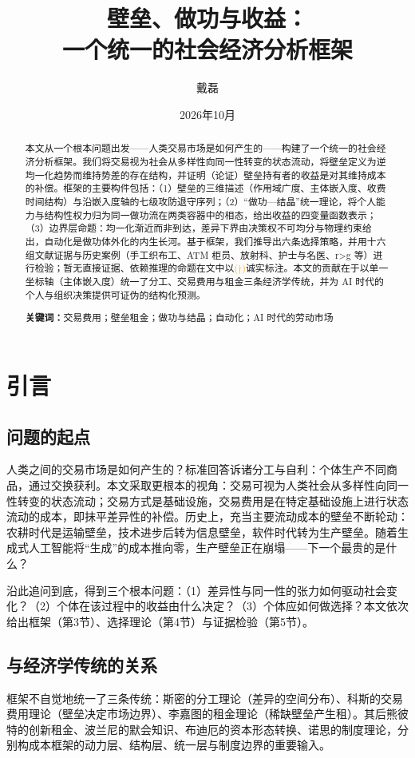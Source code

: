 \documentclass[11pt]{ctexart}
\title{壁垒、做功与收益：\\一个统一的社会经济分析框架}
\author{戴磊}
\date{2026年10月}
\newcommand{\infmark}{\textcolor{orange}{(\(\dagger\))}}
\begin{document}
\maketitle

\begin{abstract}
本文从一个根本问题出发——人类交易市场是如何产生的——构建了一个统一的社会经济分析框架。我们将交易视为社会从多样性向同一性转变的状态流动，将壁垒定义为逆均一化趋势而维持势差的存在结构，并证明（论证）壁垒持有者的收益是对其维持成本的补偿。框架的主要构件包括：（1）壁垒的三维描述（作用域广度、主体嵌入度、收费时间结构）与沿嵌入度轴的七级攻防退守序列；（2）“做功—结晶”统一理论，将个人能力与结构性权力归为同一做功流在两类容器中的相态，给出收益的四变量函数表示；（3）边界层命题：均一化渐近而非到达，差异下界由决策权不可均分与物理约束给出，自动化是做功体外化的内生长河。基于框架，我们推导出六条选择策略，并用十六组文献证据与历史案例（手工织布工、ATM 柜员、放射科、护士与名医、r>g 等）进行检验；暂无直接证据、依赖推理的命题在文中以\infmark{}诚实标注。本文的贡献在于以单一坐标轴（主体嵌入度）统一了分工、交易费用与租金三条经济学传统，并为 AI 时代的个人与组织决策提供可证伪的结构化预测。

\noindent\textbf{关键词：}交易费用；壁垒租金；做功与结晶；自动化；AI 时代的劳动市场
\end{abstract}

\section{引言}
\subsection{问题的起点}
人类之间的交易市场是如何产生的？标准回答诉诸分工与自利：个体生产不同商品，通过交换获利。本文采取更根本的视角：交易可视为人类社会从多样性向同一性转变的状态流动；交易方式是基础设施，交易费用是在特定基础设施上进行状态流动的成本，即抹平差异性的补偿。历史上，充当主要流动成本的壁垒不断轮动：农耕时代是运输壁垒，技术进步后转为信息壁垒，软件时代转为生产壁垒。随着生成式人工智能将“生成”的成本推向零，生产壁垒正在崩塌——下一个最贵的是什么？

沿此追问到底，得到三个根本问题：（1）差异性与同一性的张力如何驱动社会变化？（2）个体在该过程中的收益由什么决定？（3）个体应如何做选择？本文依次给出框架（第3节）、选择理论（第4节）与证据检验（第5节）。

\subsection{与经济学传统的关系}
框架不自觉地统一了三条传统：斯密的分工理论（差异的空间分布）、科斯的交易费用理论（壁垒决定市场边界）、李嘉图的租金理论（稀缺壁垒产生租）。其后熊彼特的创新租金、波兰尼的默会知识、布迪厄的资本形态转换、诺思的制度理论，分别构成本框架的动力层、结构层、统一层与制度边界的重要输入。
\end{document}
